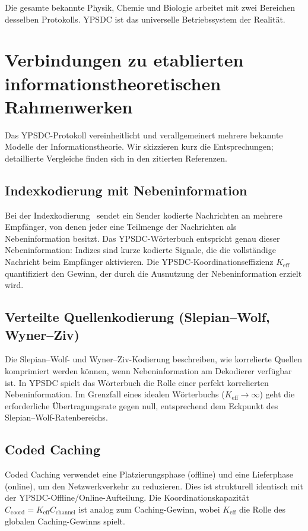 \documentclass[12pt,a4paper]{article}
\theoremstyle{remark}
\begin{document}
	Die gesamte bekannte Physik, Chemie und Biologie arbeitet mit zwei Bereichen desselben Protokolls. YPSDC ist das universelle Betriebssystem der Realität.
	
	\section{Verbindungen zu etablierten informationstheoretischen Rahmenwerken}
	\label{sec:classical-connections}
	
	Das YPSDC-Protokoll vereinheitlicht und verallgemeinert mehrere bekannte Modelle der Informationstheorie. Wir skizzieren kurz die Entsprechungen; detaillierte Vergleiche finden sich in den zitierten Referenzen.
	
	\subsection*{Indexkodierung mit Nebeninformation}
	Bei der Indexkodierung~\cite{Birk1998,BarYossef2011} sendet ein Sender kodierte Nachrichten an mehrere Empfänger, von denen jeder eine Teilmenge der Nachrichten als Nebeninformation besitzt. Das YPSDC-Wörterbuch entspricht genau dieser Nebeninformation: Indizes sind kurze kodierte Signale, die die vollständige Nachricht beim Empfänger aktivieren. Die YPSDC-Koordinationseffizienz \(K_{\mathrm{eff}}\) quantifiziert den Gewinn, der durch die Ausnutzung der Nebeninformation erzielt wird.
	
	\subsection*{Verteilte Quellenkodierung (Slepian–Wolf, Wyner–Ziv)}
	Die Slepian–Wolf- \cite{SlepianWolf1973} und Wyner–Ziv-Kodierung \cite{WynerZiv1976} beschreiben, wie korrelierte Quellen komprimiert werden können, wenn Nebeninformation am Dekodierer verfügbar ist. In YPSDC spielt das Wörterbuch die Rolle einer perfekt korrelierten Nebeninformation. Im Grenzfall eines idealen Wörterbuchs (\(K_{\mathrm{eff}} \to \infty\)) geht die erforderliche Übertragungsrate gegen null, entsprechend dem Eckpunkt des Slepian–Wolf-Ratenbereichs.
	
	\subsection*{Coded Caching}
	Coded Caching \cite{MaddahAli2014} verwendet eine Platzierungsphase (offline) und eine Lieferphase (online), um den Netzwerkverkehr zu reduzieren. Dies ist strukturell identisch mit der YPSDC-Offline/Online-Aufteilung. Die Koordinationskapazität \(C_{\mathrm{coord}} = K_{\mathrm{eff}} C_{\mathrm{channel}}\) ist analog zum Caching-Gewinn, wobei \(K_{\mathrm{eff}}\) die Rolle des globalen Caching-Gewinns spielt.
	
\end{document}
